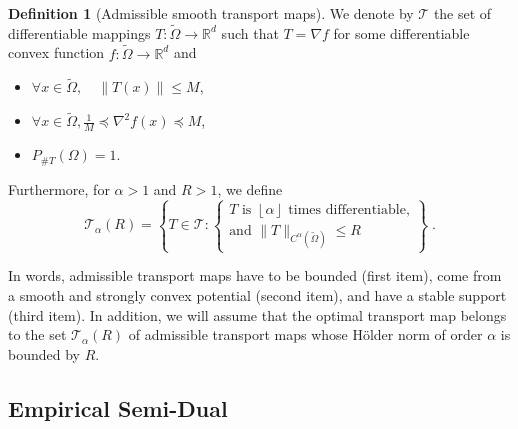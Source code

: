 \documentclass{article}
\theoremstyle{plain}
\theoremstyle{definition}
\newtheorem{definition}[theorem]{Definition}
\theoremstyle{remark}
\newcommand{\R}[0]{\mathbb{R}}
\newcommand\floor[1]{\left\lfloor {#1}\right\rfloor}
\newcommand\set[1]{\mathcal{#1}}
\begin{document}
\begin{definition}[Admissible smooth transport maps]\label{def:admtransport}
    We denote by $\mathcal{T}$ the set of differentiable mappings $T: \tilde{\Omega} \rightarrow \R^d$ such that $T = \nabla f$ for some differentiable convex function $f: \tilde{\Omega} \rightarrow \R^d$ and 
    \begin{itemize}
        \item %
        $\forall x \in \tilde{\Omega}, \quad \|T(x)\| \leq M$,
        \item  $\forall x \in \tilde{\Omega}, \frac{1}{M} \preceq \nabla^2 f (x) \preceq M$,
        \item ${P_{\# T}}(\Omega) = 1$.
    \end{itemize}
    Furthermore, for $\alpha > 1$ and $R > 1$,  we define %
    \begin{equation}
        \set{T}_{\alpha}(R) = \left\{ T \in \set{T}: 
        \begin{cases} 
        T \text{ is } \floor{\alpha}  \text{ times differentiable,}\\
        \text{and } \| T \|_{C^{\alpha}(\tilde{\Omega})} \leq R
        \end{cases}    \right\} \;.
    \end{equation}
\end{definition}

In words, admissible transport maps have to be bounded (first item), come from a smooth and strongly convex potential (second item), and have a stable support (third item). 
In addition, we will assume that the optimal transport map belongs to the set $ \set{T}_{\alpha}(R)$ of admissible transport maps whose Hölder norm of order $\alpha$ is bounded by $R$. 

\subsection{Empirical Semi-Dual}
\end{document}

